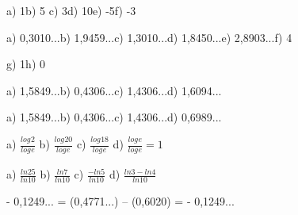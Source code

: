 \begin{respostas}{4}

    \ansitem{} a) 1\quad \quad b) 5 \quad \quad c) 3\quad \quad d) 10\quad \quad e) -5\quad \quad f) -3\quad 

    \ansitem{} a) 0,3010...\quad b) 1,9459...\quad c) 1,3010...\quad d) 1,8450...\quad e) 2,8903...\quad f) 4

\quad g) 1\quad \quad h) 0

\ansitem{} a) 1,5849...\quad b) 0,4306...\quad c) 1,4306...\quad d) 1,6094...

\ansitem{} a) 1,5849...\quad b) 0,4306...\quad c) 1,4306...\quad d) 0,6989...

\ansitem{} a)  \( \frac{log_{}2}{log_{}e} \) \quad b)  \( \frac{log_{}20}{log_{}e} \) \quad c)  \( \frac{log_{}18}{log_{}e} \) \quad d)  \( \frac{log_{}e}{log_{}e}=1 \)

\ansitem{} a)  \( \frac{ln25}{ln10} \) \quad \quad b)  \( \frac{ln7}{ln10} \) \quad \quad c)  \( \frac{-ln5}{ln10} \) \quad \quad d)  \( \frac{ln3-ln4}{ln10} \) 

\ansitem{} - 0,1249... = (0,4771...) – (0,6020) = - 0,1249...

\end{respostas}

